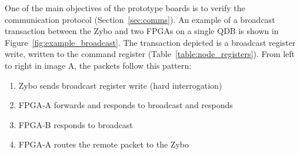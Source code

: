 One of the main objectives of the prototype boards is to verify the communication protocol (Section~\ref{sec:comms}).
An example of a broadcast transaction between the Zybo and two FPGAs on a single QDB is shown in Figure~\ref{fig:example_broadcast}.
The transaction depicted is a broadcast register write, written to the command register (Table~\ref{table:node_registers}).
From left to right in image A, the packets follow this pattern:

\begin{enumerate}
  \item Zybo sends broadcast register write (hard interrogation)
  \item FPGA-A forwards and responds to broadcast and responds
  \item FPGA-B responds to broadcast 
  \item FPGA-A routes the remote packet to the Zybo
\end{enumerate}

